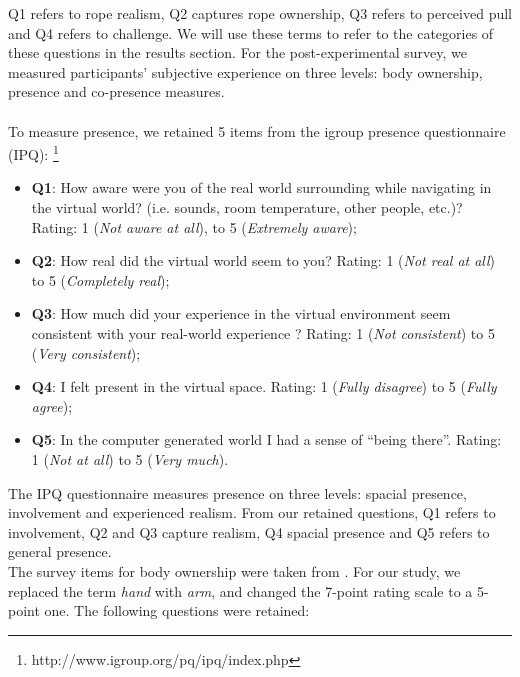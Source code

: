 Q1 refers to rope realism, Q2 captures rope ownership, Q3 refers to perceived pull and Q4 refers to challenge. We will use these terms to refer to the categories of these questions in the results section.
For the post-experimental survey, we measured participants' subjective experience on three levels: body ownership, presence and co-presence measures. \\
\\
To measure presence, we retained 5 items from the igroup presence questionnaire (IPQ): \footnote{http://www.igroup.org/pq/ipq/index.php}
\begin{itemize}
\label{enum:presenceQuestions}
\itemsep0em
    \item \textbf{Q1}: How aware were you of the real world surrounding while navigating in the virtual world? (i.e. sounds, room temperature, other people, etc.)? Rating: 1 (\textit{Not aware at all}), to 5 (\textit{Extremely aware});
    \item \textbf{Q2}: How real did the virtual world seem to you? Rating: 1 (\textit{Not real at all}) to 5 (\textit{Completely real});
    \item \textbf{Q3}: How much did your experience in the virtual environment seem consistent with your real-world experience ?  Rating: 1 (\textit{Not consistent}) to 5 (\textit{Very consistent});
    \item \textbf{Q4}: I felt present in the virtual space. Rating: 1 (\textit{Fully disagree}) to 5 (\textit{Fully agree});
    \item \textbf{Q5}: In the computer generated world I had a sense of ``being there''.  Rating: 1 (\textit{Not at all}) to 5 (\textit{Very much}). 
\end{itemize}
The IPQ questionnaire measures presence on three levels: spacial presence, involvement and experienced realism. From our retained questions, Q1 refers to involvement, Q2 and Q3 capture realism, Q4 spacial presence and Q5 refers to general presence.
\\
The survey items for body ownership were taken from \cite{argelaguet2016role}. For our study, we replaced the term \textit{hand} with \textit{arm}, and changed the 7-point rating scale to a 5-point one. The following questions were retained:
